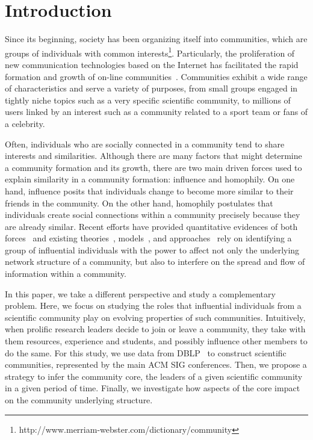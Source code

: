 \documentclass[letterpaper]{www13-companion-accepted}
\begin{document}
\section{Introduction}

Since its beginning, society has been organizing itself into communities, which are groups of individuals with common interests\footnote{http://www.merriam-webster.com/dictionary/community}.
Particularly, the proliferation of new communication technologies based on the Internet has facilitated the rapid formation and growth of on-line communities~\cite{Kleinberg@cacm2008}. 
Communities exhibit a wide range of characteristics and serve a variety of purposes, from small groups engaged in tightly niche topics such as a very specific scientific community, 
to millions of users linked by an interest such as a community related to a sport team or fans of a celebrity. 

Often, individuals who are socially connected in a community tend to share interests and similarities. Although there are many factors that might determine a community formation
and its growth, there are two main driven forces used to explain similarity in a community formation: influence and homophily. On one hand, influence posits that individuals change
to become more similar to their friends in the community. On the other hand, homophily postulates that individuals create social connections within a community precisely because
they are already similar. Recent efforts have provided quantitative evidences of both forces~\cite{icwsm10cha,crandall.kdd08,Backstrom:2006,influence.correlation.kdd08} and
existing theories~\cite{Rogers.1962,accidental-influential}, models~\cite{kempe03kdd,Kempe05influentialnodes}, and
approaches~\cite{saez-trumper@kdd12,Weng:2010:TFT:1718487.1718520} rely on identifying a group of influential individuals with the power to affect not only the underlying network
structure of a community, but also to interfere on the spread and flow of information within a community. 

In this paper, we take a different perspective and study a complementary problem. Here, we focus on studying the roles that influential individuals from a scientific community play
on evolving properties of such communities. Intuitively, when prolific research leaders decide to join or leave a community, they take with them resources,
experience and students, and possibly influence other members to do the same. For this study, we use data from DBLP~\cite{Ley:2009} to construct scientific communities, represented by the 
main ACM SIG conferences. Then, we propose a strategy to infer the community core, the leaders of a given scientific community in a given period of time. 
Finally, we investigate how aspects of the core impact on the community underlying structure. 
\end{document}
